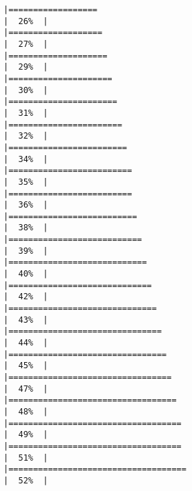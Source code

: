 \documentclass[
]{article}
\begin{document}
\begin{verbatim}
|==================                                                    |  26%  |                                                                              |===================                                                   |  27%  |                                                                              |====================                                                  |  29%  |                                                                              |=====================                                                 |  30%  |                                                                              |======================                                                |  31%  |                                                                              |=======================                                               |  32%  |                                                                              |========================                                              |  34%  |                                                                              |=========================                                             |  35%  |                                                                              |=========================                                             |  36%  |                                                                              |==========================                                            |  38%  |                                                                              |===========================                                           |  39%  |                                                                              |============================                                          |  40%  |                                                                              |=============================                                         |  42%  |                                                                              |==============================                                        |  43%  |                                                                              |===============================                                       |  44%  |                                                                              |================================                                      |  45%  |                                                                              |=================================                                     |  47%  |                                                                              |==================================                                    |  48%  |                                                                              |===================================                                   |  49%  |                                                                              |===================================                                   |  51%  |                                                                              |====================================                                  |  52%  |                                                                              
\end{verbatim}
\end{document}
